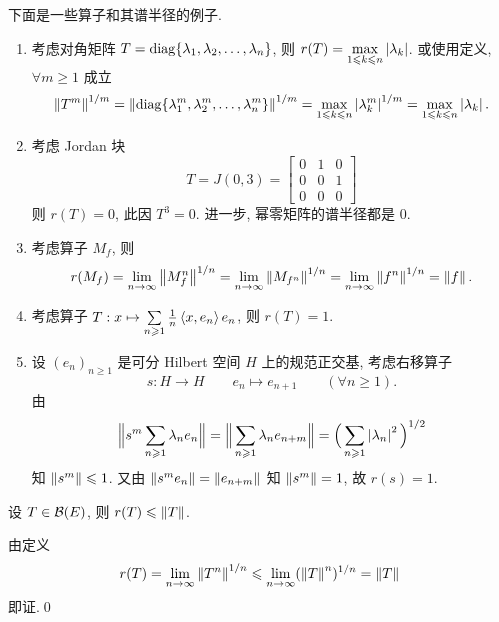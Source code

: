     \begin{Example}
        下面是一些算子和其谱半径的例子.
        \begin{enumerate}[(1)]
            \item 考虑对角矩阵 $ T=\operatorname{diag}\{ \lambda_{1}, \lambda_{2}, \dots, \lambda_{n} \} $, 则 $ r(T)=\max\limits_{1\leqslant k\leqslant n}\left| \lambda_{k} \right|  $. 或使用定义, $ \forall m\geqslant1 $ 成立
            \[
                \left\| T^{m} \right\|^{1/m}=\left\| \operatorname{diag}\{ \lambda^{m}_{1}, \lambda^{m}_{2}, \dots, \lambda^{m}_{n} \} \right\|^{1/m}=\max_{1\leqslant k\leqslant n}\left| \lambda_{k}^{m} \right| ^{1/m}=\max_{1\leqslant k\leqslant n}\left| \lambda_{k} \right| .
            \]
            \item 考虑 Jordan 块
            \[
                T = J(0, 3)=\begin{bmatrix}
                    0 & 1 & 0\\
                    0 & 0 & 1\\
                    0 & 0 & 0
                \end{bmatrix}
            \]
            则 $ r(T)=0 $, 此因 $ T^{3}=0 $. 进一步, 幂零矩阵的谱半径都是 0.
            \item 考虑算子 $ M_{f} $, 则
            \[
                r(M_{f}) = \lim_{n\to\infty}\left\| M_{f}^{n} \right\|^{1/n}=\lim_{n\to\infty}\left\| M_{f^{n}} \right\|^{1/n}=\lim_{n\to\infty}\left\| f^{n} \right\|^{1/n}=\left\| f \right\|.
            \]
            \item 考虑算子 $ T: x\mapsto\sum\limits_{n\geqslant1}\frac{1}{n}\left\langle x, e_{n} \right\rangle e_{n} $, 则 $ r(T)=1 $.
            \item 设 $ (e_{n})_{n\geqslant1} $ 是可分 Hilbert 空间 $ H $ 上的规范正交基, 考虑右移算子
            \[
                s: H\to H\qquad e_{n}\mapsto e_{n+1}\qquad (\forall n\geqslant1).
            \]
            由
            \[
                \Big\| s^{m}\sum_{n\geqslant1}\lambda_{n}e_{n} \Big\|=\Big\| \sum_{n\geqslant1}\lambda_{n}e_{n+m} \Big\|=\Big( \sum_{n\geqslant1}\left| \lambda_{n} \right| ^{2} \Big)^{1/2}
            \]
            知 $ \left\| s^{m} \right\|\leqslant1 $. 又由 $ \left\| s^{m}e_{n} \right\|=\left\| e_{n+m} \right\| $ 知 $ \left\| s^{m} \right\|=1 $, 故 $ r(s)=1 $. 
        \end{enumerate}
    \end{Example}

    \begin{Corollary}
        设 $ T\in\mathcal{B}(E) $, 则 $ r(T)\leqslant\left\| T \right\| $.
    \end{Corollary}
    \begin{Proof}
        由定义
        \[
            r(T)=\lim_{n\to\infty}\left\| T^{n} \right\|^{1/n}\leqslant\lim_{n\to\infty}(\left\| T \right\|^{n})^{1/n}=\left\| T \right\|
        \]
        即证.\qed
    \end{Proof}
    
